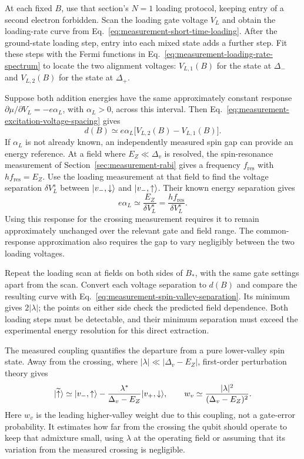 At each fixed $B$, use that section's $N=1$ loading protocol,
keeping entry of a second electron forbidden. Scan the loading
gate voltage $V_L$ and obtain the loading-rate curve from
Eq.~\eqref{eq:measurement-short-time-loading}.
After the ground-state loading step, entry into each mixed
state adds a further step. Fit these steps with the Fermi
functions in Eq.~\eqref{eq:measurement-loading-rate-spectrum}
to locate the two alignment voltages: $V_{L,1}(B)$ for the
state at $\Delta_-$ and $V_{L,2}(B)$ for the state at $\Delta_+$.

Suppose both addition energies have the same approximately
constant response $\partial\mu/\partial V_L=-e\alpha_L$,
with $\alpha_L>0$, across this interval. Then
Eq.~\eqref{eq:measurement-excitation-voltage-spacing} gives
\begin{equation}
 d(B)\simeq e\alpha_L\bigl[V_{L,2}(B)-V_{L,1}(B)\bigr].
 \label{eq:measurement-spin-valley-voltage-gap}
\end{equation}
If $\alpha_L$ is not already known, an independently measured
spin gap can provide an energy reference. At a field where
$E_Z\ll\Delta_v$ is resolved, the spin-resonance measurement of
Section~\ref{sec:measurement-rabi} gives a frequency
$f_{\mathrm{res}}$ with $hf_{\mathrm{res}}=E_Z$.
Use the loading measurement at that field to find the voltage
separation $\delta V_L^s$ between $\lvert v_-,\downarrow\rangle$ and
$\lvert v_-,\uparrow\rangle$. Their known energy separation gives
\begin{equation}
 e\alpha_L\simeq\frac{E_Z}{\delta V_L^s}
              =\frac{hf_{\mathrm{res}}}{\delta V_L^s}.
 \label{eq:measurement-spin-loading-calibration}
\end{equation}
Using this response for the crossing measurement requires it
to remain approximately unchanged over the relevant gate and
field range. The common-response approximation also requires
the gap to vary negligibly between the two loading voltages.

Repeat the loading scan at fields on both sides of $B_*$,
with the same gate settings apart from the scan. Convert each
voltage separation to $d(B)$ and compare the resulting curve
with Eq.~\eqref{eq:measurement-spin-valley-separation}.
Its minimum gives $2|\lambda|$; the points on either side
check the predicted field dependence. Both loading steps must
be detectable, and their minimum separation must exceed the
experimental energy resolution for this direct extraction.

The measured coupling quantifies the departure from a pure
lower-valley spin state. Away from the crossing, where
$|\lambda|\ll|\Delta_v-E_Z|$, first-order perturbation theory
gives
\begin{equation}
 \ket{\widetilde{\uparrow}}\simeq
 \ket{v_-,\uparrow}
 -\frac{\lambda^*}{\Delta_v-E_Z}\ket{v_+,\downarrow},
 \qquad
 w_v\simeq\frac{|\lambda|^2}{(\Delta_v-E_Z)^2}.
 \label{eq:measurement-spin-valley-admixture}
\end{equation}
Here $w_v$ is the leading higher-valley weight due to this
coupling, not a gate-error probability. It estimates how far
from the crossing the qubit should operate to keep that
admixture small, using $\lambda$ at the operating field or
assuming that its variation from the measured crossing is
negligible.
